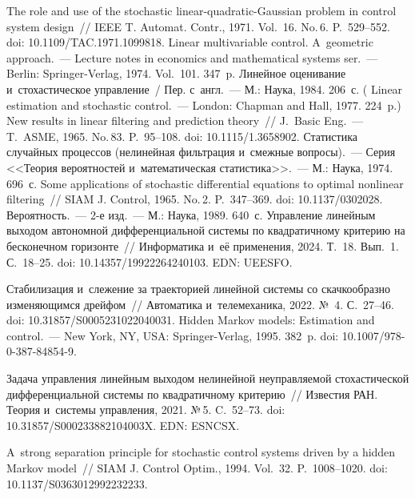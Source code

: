 \begin{multicols}{2}
{\small\frenchspacing
 { %
 \begin{thebibliography}{99}
 The role and use of the stochastic linear-quadratic-Gaussian problem in control 
system design~// IEEE T. Automat. Contr., 1971. Vol.~16. No.\,6. P.~529--552.  doi: 
10.1109/TAC.1971.1099818.
 Linear multivariable control. A~geometric approach.~--- Lecture notes in 
economics and mathematical systems ser.~--- Berlin: Springer-Verlag, 1974. Vol.~101. 347~p.
 Линейное оценивание и~стохастическое управление~/ Пер. с~англ.~--- 
М.: Наука, 1984. 206~с. ( Linear estimation and stochastic control.~--- 
London: Chapman and Hall, 1977. 224~p.)
 New results in linear filtering and prediction theory~// J.~Basic Eng.~--- 
T.~ASME, 1965. No.\,83. P.~95--108. doi: 10.1115/1.3658902.
 Статистика случайных процессов (нелинейная 
фильтрация и~смежные вопросы).~--- Серия <<Тео\-рия вероятностей и~математическая статистика>>.~--- М.: Наука, 1974. 696~с.
 Some applications of stochastic differential equations to optimal nonlinear 
filtering~// SIAM J. Control, 1965. No.\,2. P.~347--369. doi: 10.1137/0302028.
 Вероятность.~--- 2-е изд.~--- М.: Наука, 1989. 640~с.
       Управление линейным выходом автономной дифференциальной 
системы по квадратичному критерию на бесконечном горизонте~// Информатика и~её 
применения, 2024. Т.~18. Вып.~1. С.~18--25. doi: 10.14357/19922264240103. EDN: UEESFO.

 Стабилизация и~слежение за траекторией линейной системы со 
скачкообразно изменяющимся дрейфом~// Автоматика и~телемеханика, 2022. №\, 4.  
С.~27--46. doi: 10.31857/S0005231022040031.
 Hidden Markov models: Estimation and control.~--- 
New York, NY, USA: Springer-Verlag, 1995. 382~p. doi: 10.1007/978-0-387-84854-9.

 Задача управления линейным выходом нелинейной неуправляемой 
стохастической дифференциальной системы по квадратичному критерию~// Известия 
РАН. Теория и~системы управления, 2021. №\,5. C.~52--73. doi: 
10.31857/S000233882104003X. EDN: ESNCSX.

 A~strong separation principle for stochastic control systems driven by a hidden 
Markov model~// SIAM J. Control Optim., 1994. Vol.~32. P.~1008--1020. doi: 
10.1137/S0363012992232233.

\end{thebibliography}

 }
 }

\end{multicols}


